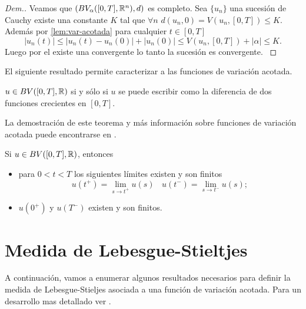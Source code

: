 \begin{proof}[Dem.]
{Veamos que $\left(BV_\alpha([0,T],\mathbb{R}^n),d\right)$ es completo. Sea $\{u_n\}$ una sucesión de Cauchy existe una constante $K$ tal que $\forall n$ $d(u_n,0)=V(u_n,[0,T])\leq K$. Además por  \ref{lem:var-acotada} para cualquier $t\in[0,T]$
\begin{equation} \label{eq:desigualdad d}
|u_n(t)|\leq|u_n(t)-u_n(0)|+|u_n(0)|\leq V(u_n,[0,T])+|\alpha|\leq K.
\end{equation}
Luego por el  
existe una  convergente lo tanto la sucesión es convergente.
}
\end{proof}







El siguiente resultado permite caracterizar a las funciones de variación acotada.

\begin{thm}\label{T-VB}
	 $u\in BV([0,T],\mathbb{R})$ si y sólo si $u$ se puede escribir como la diferencia de dos funciones crecientes en $[0,T]$.
\end{thm}

La demostración de este teorema y más información sobre funciones de variación acotada puede encontrarse en \cite{Carter}. %
\begin{cor}
	Si $u\in BV([0,T],\mathbb{R})$, entonces 
	\begin{itemize}
		\item para $0<t<T$ los siguientes límites existen y son finitos
		$$u(t^+)=\lim\limits_{s\to t^+}u(s) \ \ \ \ u(t^-)=\lim\limits_{s\to t^-}u(s);$$
		\item $u(0^+)$ y $u(T^-)$ existen y son finitos.
	\end{itemize}
\end{cor}






\section{Medida de Lebesgue-Stieltjes}
A continuación, vamos a enumerar algunos resultados necesarios para definir la medida de Lebesgue-Stieljes asociada a una función de variación acotada. Para un desarrollo mas detallado ver \cite{folland}.
